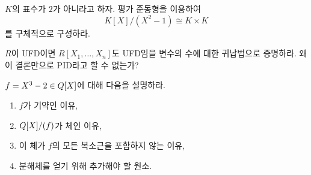 \begin{exercise}[*]
$K$의 표수가 $2$가 아니라고 하자. 평가 준동형을 이용하여
\[
 K[X]/(X^2-1)\cong K\times K
\]
를 구체적으로 구성하라.
\end{exercise}

\begin{exercise}
$R$이 UFD이면 $R[X_1,\dots,X_n]$도 UFD임을 변수의 수에 대한 귀납법으로 증명하라. 왜 이 결론만으로 PID라고 할 수 없는가?
\end{exercise}

\begin{exercise}[*]
$f=X^3-2\in Q[X]$에 대해 다음을 설명하라.
\begin{enumerate}[label=(\alph*)]
  \item $f$가 기약인 이유,
  \item $Q[X]/(f)$가 체인 이유,
  \item 이 체가 $f$의 모든 복소근을 포함하지 않는 이유,
  \item 분해체를 얻기 위해 추가해야 할 원소.
\end{enumerate}
\end{exercise}
